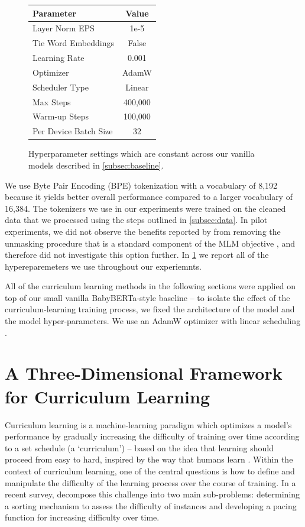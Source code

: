 \begin{figure}
    \centering
    \small
    \begin{tabular}{lc}
    \toprule
         Parameter& Value\\
    \midrule
         Layer Norm EPS& 1e-5 \\
         Tie Word Embeddings & False \\
         Learning Rate & 0.001 \\
         Optimizer & AdamW \\
         Scheduler Type & Linear\\
         Max Steps & 400,000 \\
         Warm-up Steps & 100,000\\
         Per Device Batch Size & 32 \\
    \bottomrule
    \end{tabular}
    \caption{Hyperparameter settings which are constant across our vanilla models described in \cref{subsec:baseline}.}
    \label{tbl:baseline_hyperparams}
\end{figure}

We use Byte Pair Encoding (BPE) tokenization \cite{gage1994bpe} with a vocabulary of 8,192 because it yields better overall performance compared to a larger vocabulary of 16,384. The tokenizers we use in our experiments were trained on the cleaned data that we processed using the steps outlined in \ref{subsec:data}. In pilot experiments, we did not observe the benefits reported by \citet{huebner2021babyberta} from removing the unmasking procedure that is a standard component of the MLM objective \cite{devlin2019bert}, and therefore did not investigate this option further. In \cref{tbl:baseline_hyperparams} we report all of the hypereparemeters we use throughout our experiemnts.

All of the curriculum learning methods in the following sections were applied on top of our small vanilla BabyBERTa-style baseline -- to isolate the effect of the curriculum-learning training process, we fixed the architecture of the model and the model hyper-parameters. We use an AdamW optimizer with linear scheduling \cite{loshchilov2019decoupled}.

\section{A Three-Dimensional Framework for Curriculum Learning}
Curriculum learning \cite{bengio2009curriculum} is a machine-learning paradigm which optimizes a model's performance by gradually increasing the difficulty of training over time according to a set schedule (a `curriculum') -- based on the idea that learning should proceed from easy to hard, inspired by the way that humans learn \cite{elman1993learning}.
Within the context of curriculum learning, one of the central questions is how to define and manipulate the difficulty of the learning process over the course of training. In a recent survey, \citet{soviany2022curriculum} decompose this challenge into two main sub-problems: determining a sorting mechanism to assess the difficulty of instances and developing a pacing function for increasing difficulty over time. 

